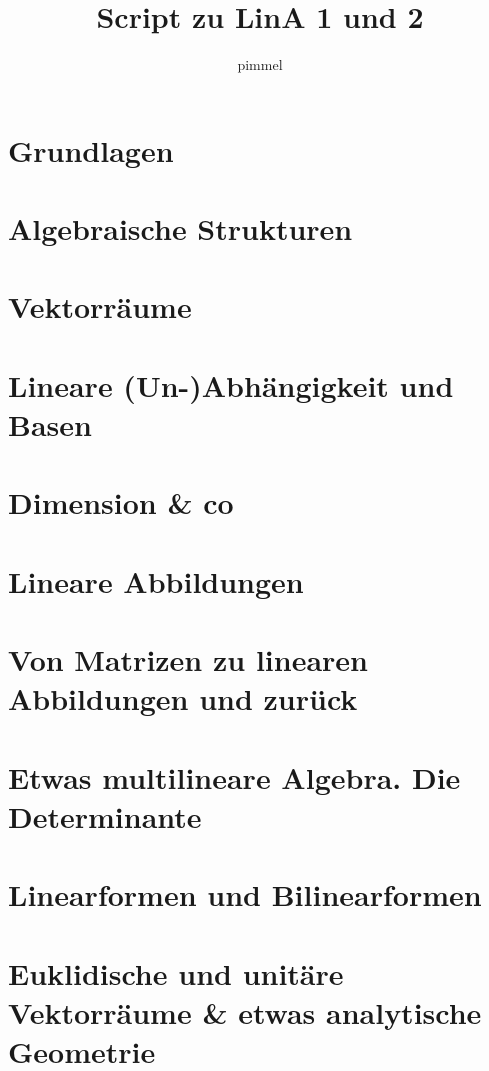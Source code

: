 \documentclass{scrartcl}
\title{Script zu LinA 1 und 2}
\author{pimmel}
\begin{document}
\begin{titlepage}
    \maketitle
\end{titlepage}   
\tableofcontents
\newpage
\section{Grundlagen}

\section{Algebraische Strukturen}

\section{Vektorräume}

\section{Lineare (Un-)Abhängigkeit und Basen}

\section{Dimension \& co}

\section{Lineare Abbildungen}

\section{Von Matrizen zu linearen Abbildungen und zurück}

\section{Etwas multilineare Algebra. Die Determinante}

\section{Linearformen und Bilinearformen}

\section{Euklidische und unitäre Vektorräume \& etwas analytische Geometrie}

\end{document}
